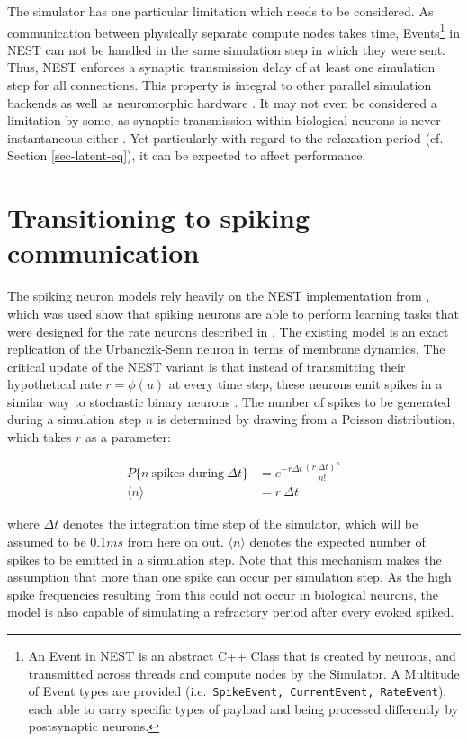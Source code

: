The simulator has one particular limitation which needs to be considered. As communication between physically separate
compute nodes takes time, Events\footnote{An Event in NEST is an abstract C++ Class that is created by neurons, and
transmitted across threads and compute nodes by the Simulator. A Multitude of Event types are provided (i.e.\
\texttt{SpikeEvent, CurrentEvent, RateEvent}), each able to carry specific types of payload and being processed
differently by postsynaptic neurons.} in NEST can not be handled in the same simulation step in which they were sent.
Thus, NEST enforces a synaptic transmission delay of at least one simulation step for all connections. This property is
integral to other parallel simulation backends \citep{Hines1997} as well as neuromorphic hardware
\citep{davies2018loihi}. It may not even be considered a limitation by some, as synaptic transmission within biological
neurons is never instantaneous either \citep{kandel2021principles}. Yet particularly with regard to the relaxation
period (cf. Section \ref{sec-latent-eq}), it can be expected to affect performance.


\section{Transitioning to spiking communication}

The spiking neuron models rely heavily on the NEST implementation from \citep{Stapmanns2021}, which was used show that
spiking neurons are able to perform learning tasks that were designed for the rate neurons described in
\citep{urbanczik2014learning}. The existing model is an exact replication of the Urbanczik-Senn neuron in terms of
membrane dynamics. The critical update of the NEST variant is that instead of transmitting their hypothetical rate $r =
\phi(u)$ at every time step, these neurons emit spikes in a similar way to stochastic binary neurons
\citep{Ginzburg1994}. The number of spikes to be generated during a simulation step $n$ is determined by drawing from a
Poisson distribution, which takes $r$ as a parameter:

\begin{align}
  P\{\textit{n} \ \text{spikes during} \ \Delta t\} & = e^{-r \Delta t} \frac{(r \ \Delta t) ^ n}{n!}\label{eq-pr-n-spikes} \\
  \langle \textit{n} \rangle                        & = r \ \Delta t \label{eq-n-spikes}
\end{align}

where $\Delta t$ denotes the integration time step of the simulator, which will be assumed to be $0.1 ms$ from here on
out.  $\langle \textit{n} \rangle$ denotes the expected number of spikes to be emitted in a simulation step. Note that
this mechanism makes the assumption that more than one spike can occur per simulation step. As the high spike
frequencies resulting from this could not occur in biological neurons, the model is also capable of simulating a
refractory period after every evoked spiked.

